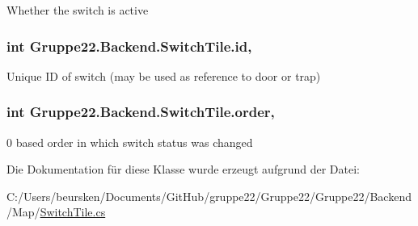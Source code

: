 Whether the switch is active 

\hypertarget{class_gruppe22_1_1_backend_1_1_switch_tile_aea9244b860d045796784dc1c00a90e13}{
\subsubsection[{id}]{\setlength{\rightskip}{0pt plus 5cm}int Gruppe22.\-Backend.\-Switch\-Tile.\-id\hspace{0.3cm}{\ttfamily [get]}, {\ttfamily [set]}}}\label{class_gruppe22_1_1_backend_1_1_switch_tile_aea9244b860d045796784dc1c00a90e13}


Unique I\-D of switch (may be used as reference to door or trap) 

\hypertarget{class_gruppe22_1_1_backend_1_1_switch_tile_ac060d5061b7ce694bd90fb7588aefdea}{
\subsubsection[{order}]{\setlength{\rightskip}{0pt plus 5cm}int Gruppe22.\-Backend.\-Switch\-Tile.\-order\hspace{0.3cm}{\ttfamily [get]}, {\ttfamily [set]}}}\label{class_gruppe22_1_1_backend_1_1_switch_tile_ac060d5061b7ce694bd90fb7588aefdea}


0 based order in which switch status was changed 



Die Dokumentation für diese Klasse wurde erzeugt aufgrund der Datei\-:\begin{DoxyCompactItemize}
\item 
C\-:/\-Users/beursken/\-Documents/\-Git\-Hub/gruppe22/\-Gruppe22/\-Gruppe22/\-Backend/\-Map/\hyperlink{_switch_tile_8cs}{Switch\-Tile.\-cs}\end{DoxyCompactItemize}
